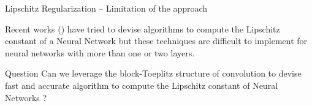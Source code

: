 \begin{frame}{Lipschitz Regularization -- Limitation of the approach}


  Recent works (\cite{scaman2018lipschitz, NIPS2019_9319, latorre2020lipschitz}) have tried to devise algorithms to compute the Lipschitz constant of a Neural Network but these techniques are difficult to implement for neural networks with more than one or two layers.

  \begin{block}{Question}
   Can we leverage the block-Toeplitz structure of convolution to devise fast and accurate algorithm to compute the Lipschitz constant of Neural Networks ? 
  \end{block}


\end{frame}

%
%
%


